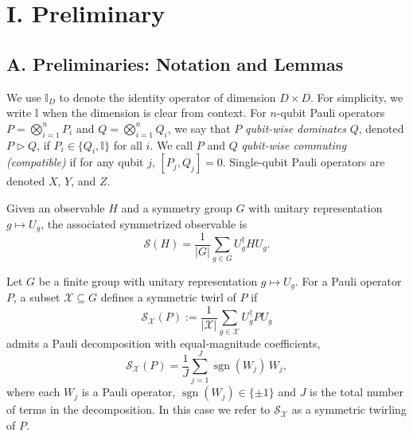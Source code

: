 \documentclass[prl,aps,notitlepage,superscriptaddress,showpacs,nofootinbib]{revtex4-2}
\newcommand{\red}[1]{{\color{red} #1}}
\begin{document}
\bigskip

\renewcommand{\theequation}{S\arabic{equation}}
\setcounter{equation}{0}



\section{I. Preliminary}

\subsection{A. Preliminaries: Notation and Lemmas}
We use $\mathbb{I}_D$ to denote the identity operator of dimension $D \times D$. For simplicity, we write $\mathbb{I}$ when the dimension is clear from context. 
For $n$-qubit Pauli operators $P=\bigotimes_{i=1}^n P_i$ and $Q=\bigotimes_{i=1}^n Q_i$, we say that $P$ \emph{qubit-wise dominates} $Q$, denoted $P \triangleright Q$, if $P_i\in\{Q_i,\mathbb{I}\}$ for all $i$. 
We call $P$ and $Q$ \emph{qubit-wise commuting (compatible)} if for any qubit $j$, $[P_j,Q_j]=0$. 
Single-qubit Pauli operators are denoted $X$, $Y$, and $Z$.


Given an observable $H$ and a symmetry group $G$ with unitary representation $g\mapsto U_g$, the associated symmetrized observable is
\begin{equation}
    \mathcal{S}(H)=\frac{1}{|G|}\sum_{g\in G} U_g^\dagger H U_g .
\end{equation}

\begin{definition}
Let $G$ be a finite group with unitary representation $g\mapsto U_g$. 
For a Pauli operator $P$, a subset $\mathcal{X}\subseteq G$ {defines a symmetric twirl of $P$} if
\begin{equation}
    \mathcal{S}_{\mathcal{X}}(P):=\frac{1}{|\mathcal{X}|}\sum_{g\in\mathcal{X}} U_g^\dagger P U_g
\end{equation}
admits a Pauli decomposition with equal-magnitude coefficients,
\begin{equation}
    \mathcal{S}_{\mathcal{X}}(P)=\frac{1}{J}\sum_{j=1}^J \operatorname{sgn}(W_j)\,W_j,
\end{equation}
where each $W_j$ is a Pauli operator, $\operatorname{sgn}(W_j)\in\{\pm1\}$ \red{ and $J$ is the total number of terms in the decomposition}. 
In this case we refer to $\mathcal{S}_{\mathcal{X}}$ as a symmetric twirling of $P$.
\end{definition}
\end{document}
